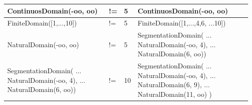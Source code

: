\begin{longtable}{ | p{6cm} | p{2cm}| p{3.5cm}| p{6.5cm}|  }
    \hline
    ContinuosDomain(-oo, oo)          &
    !=                                &
    5                                 &
    ContinuosDomain(-oo, oo)                                                                            \\
    \hline
    FiniteDomain([1,...,10])          &
    !=                                &
    5                                 &
    FiniteDomain([1,...,4,6, ...10])                                                                    \\
    \hline
    NaturalDomain(-oo, oo)            &
    !=                                &
    5                                 &
    SegmentationDomain(\newline
    ... NaturalDomain(-oo, 4),\newline
    ... NaturalDomain(6, oo))                                                                           \\
    \hline
    SegmentationDomain(\newline
    ... NaturalDomain(-oo, 4), \newline
    ... NaturalDomain(6, oo))         &
    !=                                &
    10                                &
    SegmentationDomain(\newline
    ... NaturalDomain(-oo, 4),\newline
    ... NaturalDomain(6, 9), \newline
    ... NaturalDomain(11, oo) )                                                                         \\

\end{longtable}
